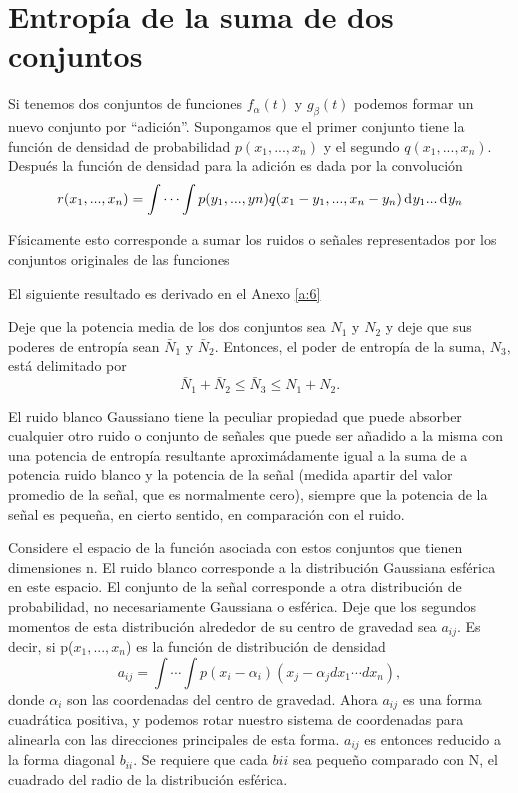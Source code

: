 
\chapter{Entrop\'ia de la suma de dos conjuntos}
\label{sec:23}           

Si tenemos dos conjuntos de funciones $f_{\alpha}(t)$ y $g_{\beta}(t)$
podemos formar un nuevo conjunto por ``adici\'on''. Supongamos que el
primer conjunto tiene la funci\'on de densidad de probabilidad
$p(x_{1},...,x_{n})$ y el segundo $q(x_{1},...,x_{n})$.  Despu\'es la
funci\'on de densidad para la adici\'on es dada por la convoluci\'on
\begin{equation} 
r(x_{1},...,x_{n}) = \int \cdots \int
p(y_{1},...,y{n})q(x_{1}-y_{1},...,x_{n}-y_{n}) \diff y_{1}... \diff
y_{n} 
\end{equation}
	
F\'isicamente esto corresponde a sumar los ruidos o se\~nales
representados por los conjuntos originales de las funciones
	
El siguiente resultado es derivado en el Anexo \ref{a:6}

\begin{theorem} 
Deje que la potencia media de los dos conjuntos sea $N_{1}$ y $N_{2}$
y deje que sus poderes de entrop\'ia sean $\bar{N}_1$ y
$\bar{N}_2$. Entonces, el poder de entrop\'ia de la suma, $N_{3}$,
est\'a delimitado por
\begin{equation} 
\bar{N}_1+\bar{N}_2 \le \bar{N}_3 \le N_{1} + N_{2}.
\end{equation} 
\end{theorem}
	
El ruido blanco Gaussiano tiene la peculiar propiedad que puede
absorber cualquier otro ruido o conjunto de se\~nales que puede ser
a\~nadido a la misma con una potencia de entrop\'ia resultante
aproxim\'adamente igual a la suma de a potencia ruido blanco y la
potencia de la se\~nal (medida apartir del valor promedio de la
se\~nal, que es normalmente cero), siempre que la potencia de la
se\~{n}al es peque\~na, en cierto sentido, en comparaci\'on con el
ruido.
	
Considere el espacio de la funci\'on asociada con estos conjuntos que
tienen dimensiones n. El ruido blanco corresponde a la distribuci\'on
Gaussiana esf\'erica en este espacio. El conjunto de la se\~nal
corresponde a otra distribuci\'on de probabilidad, no necesariamente
Gaussiana o esf\'erica. Deje que los segundos momentos de esta
distribuci\'on alrededor de su centro de gravedad sea $a_{ij}$.  Es
decir, si p($x_{1},...,x_{n}$) es la funci\'on de distribuci\'on de
densidad 
\begin{equation} 
a_{ij}=\int \cdots \int p(x_{i}-\alpha_{i})(x_{j}-\alpha_{j}dx_{1}
\cdots dx_{n}),
\end{equation} 
donde $\alpha_{i}$ son las coordenadas del centro de gravedad. Ahora
$a_{ij}$ es una forma cuadr\'atica positiva, y podemos rotar nuestro
sistema de coordenadas para alinearla con las direcciones principales
de esta forma. $a_{ij}$ es entonces reducido a la forma diagonal
$b_{ii}$. Se requiere que cada $b{ii}$ sea peque\~no comparado con N,
el cuadrado del radio de la distribuci\'on esf\'erica.
	
